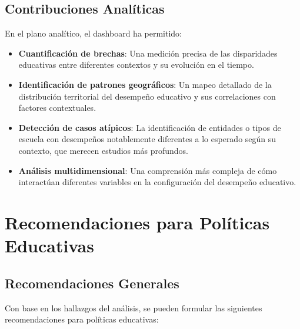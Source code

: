 \subsection{Contribuciones Analíticas}
En el plano analítico, el dashboard ha permitido:

\begin{itemize}
    \item \textbf{Cuantificación de brechas}: Una medición precisa de las disparidades educativas entre diferentes contextos y su evolución en el tiempo.
    
    \item \textbf{Identificación de patrones geográficos}: Un mapeo detallado de la distribución territorial del desempeño educativo y sus correlaciones con factores contextuales.
    
    \item \textbf{Detección de casos atípicos}: La identificación de entidades o tipos de escuela con desempeños notablemente diferentes a lo esperado según su contexto, que merecen estudios más profundos.
    
    \item \textbf{Análisis multidimensional}: Una comprensión más compleja de cómo interactúan diferentes variables en la configuración del desempeño educativo.
\end{itemize}

\section{Recomendaciones para Políticas Educativas}

\subsection{Recomendaciones Generales}
Con base en los hallazgos del análisis, se pueden formular las siguientes recomendaciones para políticas educativas:

